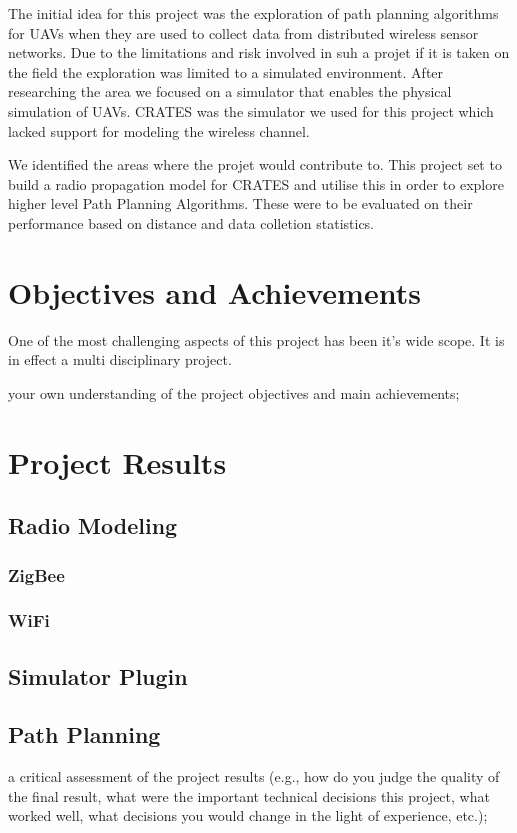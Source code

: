 The initial idea for this project was the exploration of path planning
algorithms for UAVs when they are used to collect data from distributed wireless
sensor networks. Due to the limitations and risk involved in suh a projet if it
is taken on the field the exploration was limited to a simulated environment.
After researching the area we focused on a simulator that enables the physical
simulation of UAVs. CRATES was the simulator we used for this project which
lacked support for modeling the wireless channel.

We identified the areas where the projet would contribute to. This project set
to build a radio propagation model for CRATES and utilise this in order to
explore higher level Path Planning Algorithms. These were to be evaluated on
their performance based on distance and data colletion statistics.



\section{Objectives and Achievements}
One of the most challenging aspects of this project has been it's wide scope. It
is in effect a multi disciplinary project.


your own understanding of the project objectives and main achievements;

\section{Project Results}
\subsection{Radio Modeling}
\subsubsection{ZigBee}
\subsubsection{WiFi}
\subsection{Simulator Plugin}
\subsection{Path Planning}
a critical assessment of the project results (e.g., how do you judge the
quality of the final result, what were the important technical decisions
this project, what worked well, what decisions you would change in the light
of experience, etc.);

